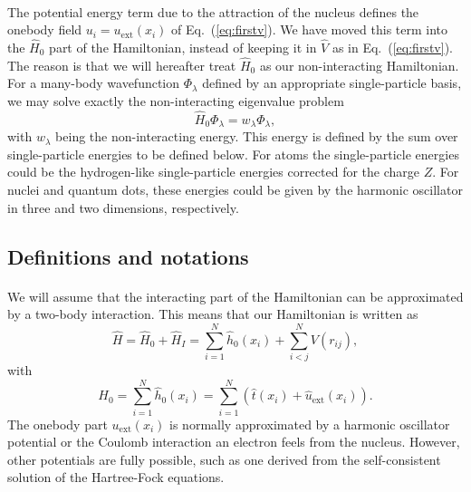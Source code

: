 \documentclass[%
twoside,                 %
final,                   %
10pt]{article}
\begin{document}
\paragraph{}
The potential energy term due to the attraction of the nucleus defines the onebody field $u_i=u_{\mathrm{ext}}(x_i)$ of Eq.~(\ref{eq:firstv}).
We have moved this term into the $\hat{H}_0$ part of the Hamiltonian, instead of keeping  it in $\hat{V}$ as in  Eq.~(\ref{eq:firstv}).
The reason is that we will hereafter treat $\hat{H}_0$ as our non-interacting  Hamiltonian. For a many-body wavefunction $\Phi_{\lambda}$ defined by an  
appropriate single-particle basis, we may solve exactly the non-interacting eigenvalue problem 
\[
\hat{H}_0\Phi_{\lambda}= w_{\lambda}\Phi_{\lambda},
\]
with $w_{\lambda}$ being the non-interacting energy. This energy is defined by the sum over single-particle energies to be defined below.
For atoms the single-particle energies could be the hydrogen-like single-particle energies corrected for the charge $Z$. For nuclei and quantum
dots, these energies could be given by the harmonic oscillator in three and two dimensions, respectively.



\subsection{Definitions and notations}

\paragraph{}
We will assume that the interacting part of the Hamiltonian
can be approximated by a two-body interaction.
This means that our Hamiltonian is written as 
\begin{equation}
    \hat{H} = \hat{H}_0 + \hat{H}_I 
    = \sum_{i=1}^N \hat{h}_0(x_i) + \sum_{i < j}^N V(r_{ij}),
\label{Hnuclei}
\end{equation}
with 
\begin{equation}
  H_0=\sum_{i=1}^N \hat{h}_0(x_i) =  \sum_{i=1}^N\left(\hat{t}(x_i) + \hat{u}_{\mathrm{ext}}(x_i)\right).
\label{hinuclei}
\end{equation}
The onebody part $u_{\mathrm{ext}}(x_i)$ is normally approximated by a harmonic oscillator potential or the Coulomb interaction an electron feels from the nucleus. However, other potentials are fully possible, such as 
one derived from the self-consistent solution of the Hartree-Fock equations.
\end{document}
